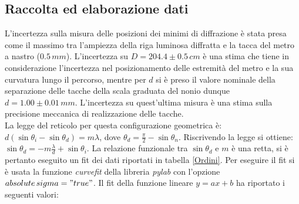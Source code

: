 \documentclass[10pt,a4paper]{article}
\begin{document}

\subsection{Raccolta ed elaborazione dati}

L'incertezza sulla misura delle posizioni dei minimi di diffrazione è stata presa come il massimo tra l'ampiezza della riga luminosa diffratta e la tacca del metro a nastro ($0.5 \,mm$). L'incertezza su $D = 204.4 \pm 0.5 \, cm$ è una stima che tiene in considerazione l'incertezza nel posizionamento delle estremità del metro e la sua curvatura lungo il percorso, mentre per $d$ si è preso il valore nominale della separazione delle tacche della scala graduata del nonio dunque $d = 1.00 \pm 0.01 \, mm$. L'incertezza su quest'ultima misura è una stima sulla precisione meccanica di realizzazione delle tacche.\\
La legge del reticolo per questa configurazione geometrica è: $d(\sin  \theta_i - \sin \theta_d)  = m \lambda $, dove $\theta_d = \frac{\pi}{2} - \sin \theta_n $. Riscrivendo la legge si ottiene: $\sin \theta_d = -m \frac{\lambda}{d} + \sin \theta_i$. La relazione funzionale tra $\sin  \theta_d$ e $m$ è una retta, si è pertanto eseguito un fit dei dati riportati in tabella \ref{Ordini}. Per eseguire il fit si è usata la funzione \emph{curvefit} della libreria \emph{pylab} con l'opzione \emph{$absolute\,sigma = "true"$}. Il fit della funzione lineare $y = ax+b$ ha riportato i seguenti valori: \\
\end{document}
